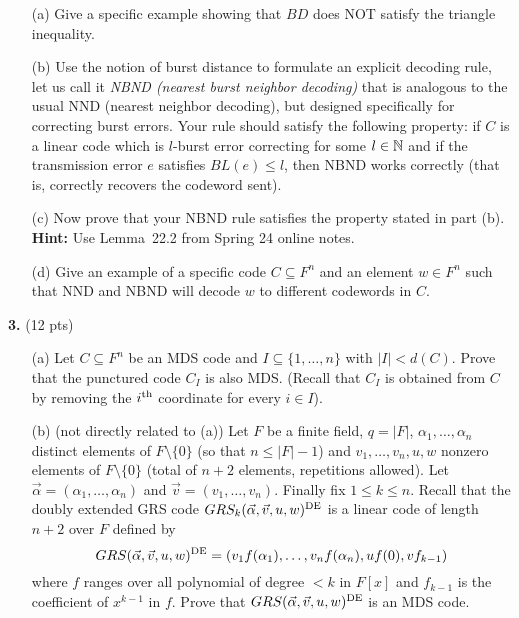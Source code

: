\documentclass[12pt]{amsart}
\begin{document}
\begin{itemize}
\item[(a)] Give a specific example showing that $BD$ does NOT satisfy the triangle inequality.
\item[(b)] Use the notion of burst distance to formulate an explicit decoding rule, let us call it {\it NBND (nearest burst neighbor decoding)} that is analogous to the usual NND (nearest neighbor decoding), but designed specifically for correcting burst errors. Your rule should satisfy the following property: if $C$ is a linear code which is $l$-burst error correcting for some $l\in{\mathbb N}$ and if the transmission error $e$ satisfies
$BL(e)\leq l$, then NBND works correctly (that is, correctly recovers the codeword sent).
\item[(c)] Now prove that your NBND rule satisfies the property stated in part (b). {\bf Hint:} Use Lemma~22.2 from Spring 24 online notes.
\item[(d)] Give an example of a specific code $C\subseteq F^n$ and an element $w\in F^n$ such that NND and NBND will decode $w$
to different codewords in $C$.
\end{itemize}

{\bf 3.} (12 pts)
\begin{itemize}
\item[(a)] Let $C\subseteq F^n$ be an MDS code and $I\subseteq \{1,\ldots, n\}$ with $|I|<d(C)$. Prove that the punctured code
$C_I$ is also MDS. (Recall that $C_I$ is obtained from $C$ by removing the $i^{\rm th}$ coordinate for every $i\in I$).
\item[(b)] (not directly related to (a)) Let $F$ be a finite field, $q=|F|$, $\alpha_1,\ldots, \alpha_n$ distinct elements
of $F\setminus\{0\}$ (so that $n\leq |F|-1$) and $v_1,\ldots, v_n,u,w$ nonzero elements of $F\setminus\{0\}$ (total of $n+2$
elements, repetitions allowed). Let $\vec{\alpha}=(\alpha_1,\ldots, \alpha_n)$ and $\vec{v}=(v_1,\ldots, v_n)$. 
Finally fix $1\leq k\leq n$. Recall
that the doubly extended GRS code $GRS_k(\vec{\alpha},\vec{v},u,w)^{\rm{DE}}$ is a linear code of length $n+2$ over $F$ defined by
$$GRS(\vec{\alpha},\vec{v},u,w)^{\rm{DE}}=(v_1 f(\alpha_1),\ldots, v_n f(\alpha_n), uf(0), vf_{k-1})$$
where $f$ ranges over all polynomial of degree $<k$ in $F[x]$ and $f_{k-1}$ is the coefficient of $x^{k-1}$ in $f$.
Prove that $GRS(\vec{\alpha},\vec{v},u,w)^{\rm{DE}}$ is an MDS code.
\end{itemize}

\skv
\end{document}
